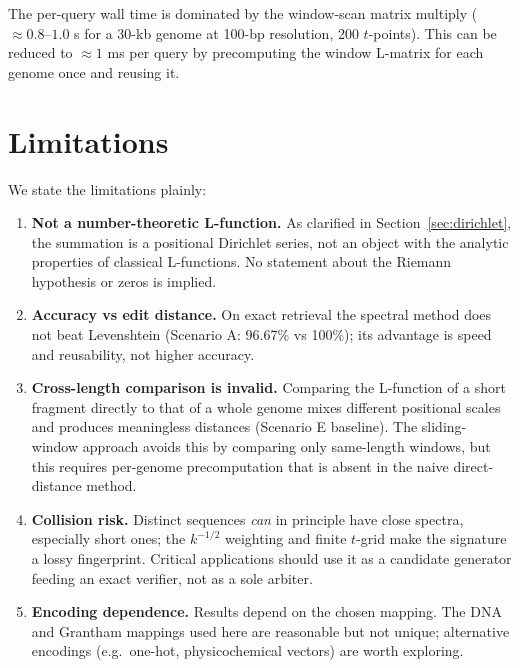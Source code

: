 \documentclass[12pt,a4paper]{article}
\begin{document}
The per-query wall time is dominated by the window-scan matrix multiply
($\approx 0.8$--$1.0$ s for a 30-kb genome at 100-bp resolution, 200
$t$-points).  This can be reduced to $\approx 1$ ms per query by
precomputing the window L-matrix for each genome once and reusing it.

\section{Limitations}
\label{sec:limits}

We state the limitations plainly:

\begin{enumerate}[label=(\roman*)]
    \item \textbf{Not a number-theoretic L-function.} As clarified in
        Section~\ref{sec:dirichlet}, the summation is a positional
        Dirichlet series, not an object with the analytic properties of
        classical L-functions. No statement about the Riemann hypothesis
        or zeros is implied.
    \item \textbf{Accuracy vs edit distance.} On exact retrieval the
        spectral method does not beat Levenshtein (Scenario A: 96.67\%
        vs 100\%); its advantage is speed and reusability, not higher
        accuracy.
    \item \textbf{Cross-length comparison is invalid.} Comparing the
        L-function of a short fragment directly to that of a whole genome
        mixes different positional scales and produces meaningless
        distances (Scenario E baseline).  The sliding-window approach
        avoids this by comparing only same-length windows, but this
        requires per-genome precomputation that is absent in the naive
        direct-distance method.
    \item \textbf{Collision risk.} Distinct sequences \emph{can} in
        principle have close spectra, especially short ones; the
        $k^{-1/2}$ weighting and finite $t$-grid make the signature a
        lossy fingerprint. Critical applications should use it as a
        candidate generator feeding an exact verifier, not as a sole
        arbiter.
    \item \textbf{Encoding dependence.} Results depend on the chosen
        mapping. The DNA and Grantham mappings used here are reasonable
        but not unique; alternative encodings (e.g.\ one-hot, physicochemical
        vectors) are worth exploring.
\end{enumerate}
\end{document}
